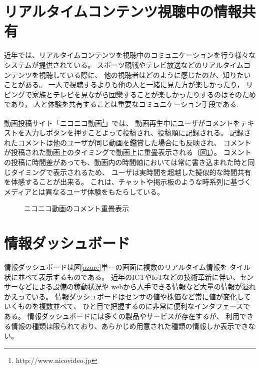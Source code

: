 \section{リアルタイムコンテンツ視聴中の情報共有}

近年では、リアルタイムコンテンツを視聴中のコミュニケーションを行う様々なシステムが提供されている。
スポーツ観戦やテレビ放送などのリアルタイムコンテンツを視聴している際に、
他の視聴者はどのように感じたのか、知りたいことがある。
一人で視聴するよりも他の人と一緒に見た方が楽しかったり，
リビングで家族とテレビを見ながら団欒することが楽しかったりするのはそのためであり，
人と体験を共有することは重要なコミュニケーション手段である.

動画投稿サイト「ニコニコ動画\footnote{http://www.nicovideo.jp}」では、
動画再生中にユーザがコメントをテキストを入力しボタンを押すことよって投稿され、投稿順に記録される。
記録されたコメントは他のユーザが同じ動画を鑑賞した場合にも反映され、
コメントが投稿された動画上のタイミングで動画上に重畳表示される（図\ref{niconico}）。
コメントの投稿に時間差があっても、動画内の時間軸においては常に書き込まれた時と同じタイミングで表示されるため、
ユーザは実時間を超越した擬似的な時間共有を体感することが出来る。
これは、チャットや掲示板のような時系列に基づくメディアとは異なるユーザ体験をもたらしている\cite{110006793374}。

\begin{figure}[H]
\centering
{}
\caption{ニコニコ動画のコメント重畳表示}
\label{niconico}
\end{figure}


\section{情報ダッシュボード}

情報ダッシュボードは図\ref{azure}単一の画面に複数のリアルタイム情報を
タイル状に並べて表示するものである\cite{few}\cite{few2005}。
近年のICTやIoTなどの技術革新に伴い、センサーなどによる設備の稼動状況や
webから入手できる情報など大量の情報が溢れかえっている。
情報ダッシュボードはセンサの値や株価など常に値が変化していくものを複数並べて、
ひと目で把握するのに非常に便利なインタフェースである。
情報ダッシュボードには多くの製品やサービスが存在するが、
利用できる情報の種類は限られており、あらかじめ用意された種類の情報しか表示できない。

